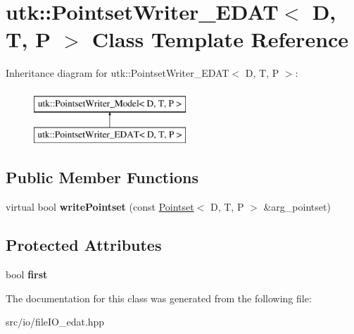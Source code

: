 \hypertarget{classutk_1_1PointsetWriter__EDAT}{\section{utk\-:\-:Pointset\-Writer\-\_\-\-E\-D\-A\-T$<$ D, T, P $>$ Class Template Reference}
\label{classutk_1_1PointsetWriter__EDAT}
}
Inheritance diagram for utk\-:\-:Pointset\-Writer\-\_\-\-E\-D\-A\-T$<$ D, T, P $>$\-:\begin{figure}[H]
\begin{center}
\leavevmode
\includegraphics[height=2.000000cm]{classutk_1_1PointsetWriter__EDAT}
\end{center}
\end{figure}
\subsection*{Public Member Functions}
\begin{DoxyCompactItemize}
\item 
\hypertarget{classutk_1_1PointsetWriter__EDAT_a5638d47d612b9112725f66ad120b8bef}{virtual bool {\bfseries write\-Pointset} (const \hyperlink{classutk_1_1Pointset}{Pointset}$<$ D, T, P $>$ \&arg\-\_\-pointset)}\label{classutk_1_1PointsetWriter__EDAT_a5638d47d612b9112725f66ad120b8bef}

\end{DoxyCompactItemize}
\subsection*{Protected Attributes}
\begin{DoxyCompactItemize}
\item 
\hypertarget{classutk_1_1PointsetWriter__EDAT_a0bafd25ede571c09b8ef009c2b5173b6}{bool {\bfseries first}}\label{classutk_1_1PointsetWriter__EDAT_a0bafd25ede571c09b8ef009c2b5173b6}

\end{DoxyCompactItemize}


The documentation for this class was generated from the following file\-:\begin{DoxyCompactItemize}
\item 
src/io/file\-I\-O\-\_\-edat.\-hpp\end{DoxyCompactItemize}
